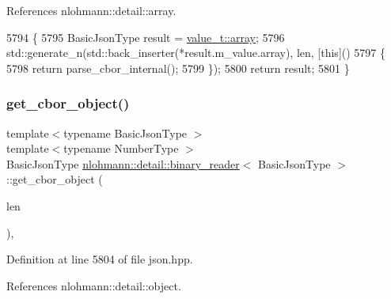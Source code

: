 References nlohmann\+::detail\+::array.


\begin{DoxyCode}
5794     \{
5795         BasicJsonType result = \hyperlink{namespacenlohmann_1_1detail_a1ed8fc6239da25abcaf681d30ace4985af1f713c9e000f5d3f280adbd124df4f5}{value\_t::array};
5796         std::generate\_n(std::back\_inserter(*result.m\_value.array), len, [\textcolor{keyword}{this}]()
5797         \{
5798             return parse\_cbor\_internal();
5799         \});
5800         \textcolor{keywordflow}{return} result;
5801     \}
\end{DoxyCode}
\mbox{\label{classnlohmann_1_1detail_1_1binary__reader_ac10de53e05ff19b4860c73f52a6871a9}} 
\subsubsection{\texorpdfstring{get\+\_\+cbor\+\_\+object()}{get\_cbor\_object()}}
{\footnotesize\ttfamily template$<$typename Basic\+Json\+Type $>$ \\
template$<$typename Number\+Type $>$ \\
Basic\+Json\+Type \hyperlink{classnlohmann_1_1detail_1_1binary__reader}{nlohmann\+::detail\+::binary\+\_\+reader}$<$ Basic\+Json\+Type $>$\+::get\+\_\+cbor\+\_\+object (\begin{DoxyParamCaption}\item[{const Number\+Type}]{len }\end{DoxyParamCaption})\hspace{0.3cm}{\ttfamily [inline]}, {\ttfamily [private]}}



Definition at line 5804 of file json.\+hpp.



References nlohmann\+::detail\+::object.


